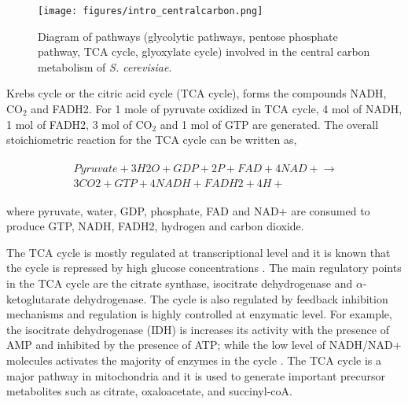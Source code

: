 \begin{figure}[H]
\texttt{[image: figures/intro\_centralcarbon.png]}
\caption[Diagram of pathways (glycolytic pathways, pentose phosphate pathway, TCA cycle, glyoxylate cycle) involved in the central carbon metabolism of \emph{S. cerevisiae}]{Diagram of pathways (glycolytic pathways, pentose phosphate pathway, TCA cycle, glyoxylate cycle) involved in the central carbon metabolism of \emph{S. cerevisiae}.}
\label{fig:intro_centralcarbon}
\end{figure}

 \vspace{-0.5cm}

Krebs cycle or the citric acid cycle (TCA cycle), forms the compounds NADH, CO$_2$ and FADH2. For 1 mole of pyruvate oxidized in TCA cycle, 4 mol of NADH, 1 mol of FADH2, 3 mol of CO$_2$ and 1 mol of GTP are generated. The overall stoichiometric reaction for the TCA cycle can be written as,

\begin{align}
  \begin{split}
  \ Pyruvate + 3 H2O + GDP + 2 P + FAD + 4 NAD+ \xrightarrow{} \\
  \ 3 CO2 + GTP + 4 NADH + FADH2 + 4 H+
  \end{split}
\end{align}

\noindent where pyruvate, water, GDP, phosphate, FAD and NAD+ are consumed to produce GTP, NADH, FADH2, hydrogen and carbon dioxide.

The TCA cycle is mostly regulated at transcriptional level and it is known that the cycle is repressed by high glucose concentrations \cite{liu1999transcriptional}. The main regulatory points in the TCA cycle are the citrate synthase, isocitrate dehydrogenase and $\alpha$-ketoglutarate dehydrogenase. The cycle is also regulated by feedback inhibition mechanisms and regulation is highly controlled at enzymatic level. For example, the isocitrate dehydrogenase (IDH) is increases its activity with the presence of AMP and inhibited by the presence of ATP\cite{coleman1975regulation}; while the low level of NADH/NAD+ molecules activates the majority of enzymes in the cycle \cite{gadde1997mutations}. The TCA cycle is a major pathway in mitochondria and it is used to generate important precursor metabolites such as citrate, oxaloacetate, and succinyl-coA.

